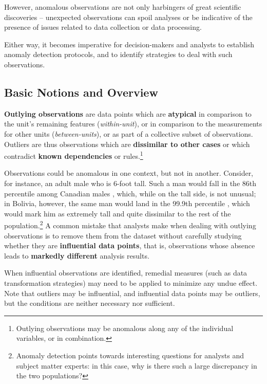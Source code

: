 However, anomalous observations are not only harbingers of great scientific discoveries -- unexpected observations can spoil analyses or be indicative of the presence of issues related to data collection or data processing. \par Either way, it becomes imperative for decision-makers and analysts to establish anomaly detection protocols, and to identify strategies to deal with such observations.  
\subsection{Basic Notions and Overview}
\textbf{Outlying observations} are data points which are \textbf{atypical} in comparison to the unit's remaining features (\textit{within-unit}), or in comparison to the measurements for other units (\textit{between-units}), or as part of a collective subset of observations. Outliers are thus observations which are \textbf{dissimilar to other cases} or which contradict \textbf{known dependencies} or rules.\footnote{Outlying observations may be anomalous along any of the individual variables, or in combination.}%
\par Observations could be anomalous in one context, but not in another. Consider, for instance, an adult male who is 6-foot tall. Such a man would fall in the 86th percentile among Canadian males \cite{DP_HPC}, which, while on the tall side, is not unusual; in Bolivia, however, the same man would land in the 99.9th percentile \cite{DP_HPC}, which would mark him as extremely tall and quite dissimilar to the rest of the population.\footnote{Anomaly detection points towards interesting questions for analysts and subject matter experts: in this case, why is there such a large discrepancy in the two populations?}  
\newl
A common mistake that analysts make when dealing with outlying observations is to remove them from the dataset without carefully studying whether they are \textbf{influential data points}, that is, observations whose absence leads to \textbf{markedly different} analysis results.\par When influential observations are identified, remedial measures (such as data transformation strategies) may need to be applied to minimize any undue effect. Note that outliers may be influential, and influential data points may be outliers, but the conditions are neither necessary nor sufficient. 
